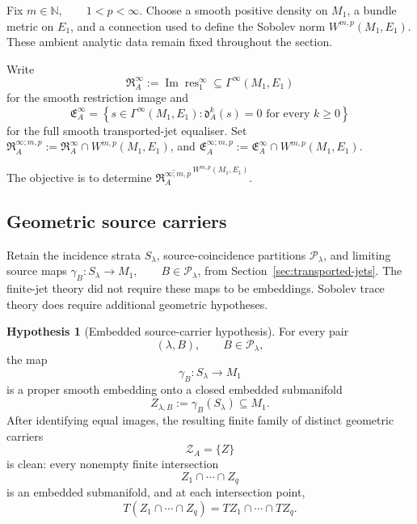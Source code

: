 \documentclass[11pt]{article}
\theoremstyle{plain}
\theoremstyle{definition}
\newtheorem{hypothesis}[theorem]{Hypothesis}
\begin{document}
Fix
\(m\in\mathbb N, \qquad 1<p<\infty\).
Choose a smooth positive density on \(M_1\), a bundle metric on
\(E_1\), and a connection used to define the Sobolev norm
\(W^{m,p}(M_1,E_1)\).
These ambient analytic data remain fixed throughout the section.

Write
\[
  \mathfrak R_A^\infty
  :=
  \operatorname{Im}\operatorname{res}_1^\infty
  \subseteq
  \Gamma^\infty(M_1,E_1)
\]
for the smooth restriction image and
\[
  \mathfrak E_A^\infty
  =
  \left\{
    s\in\Gamma^\infty(M_1,E_1):
    \mathfrak d_A^k(s)=0
    \text{ for every }k\geq0
  \right\}
\]
for the full smooth transported-jet equaliser. Set
\(\mathfrak R_A^{\infty;m,p} := \mathfrak R_A^\infty \cap W^{m,p}(M_1,E_1)\),
and
\(\mathfrak E_A^{\infty;m,p} := \mathfrak E_A^\infty \cap W^{m,p}(M_1,E_1)\).

The objective is to determine
\(\overline{ \mathfrak R_A^{\infty;m,p} }^{\,W^{m,p}(M_1,E_1)}\).

\subsection{Geometric source carriers}
\label{subsec:visible-incidence-traces}

Retain the incidence strata \(S_\lambda\), source-coincidence
partitions \(\mathcal P_\lambda\), and limiting source maps
\(\gamma_B: S_\lambda\longrightarrow M_1, \qquad B\in\mathcal P_\lambda\),
from Section~\ref{sec:transported-jets}. The finite-jet theory did not
require these maps to be embeddings. Sobolev trace theory does require
additional geometric hypotheses.

\begin{hypothesis}[Embedded source-carrier hypothesis]
\label{hyp:embedded-source-carriers}
For every pair
\[
  (\lambda,B),
  \qquad
  B\in\mathcal P_\lambda,
\]
the map
\[
  \gamma_B:
  S_\lambda\longrightarrow M_1
\]
is a proper smooth embedding onto a closed embedded submanifold
\[
  Z_{\lambda,B}
  :=
  \gamma_B(S_\lambda)
  \subseteq M_1.
\]
After identifying equal images, the resulting finite family of
distinct geometric carriers
\[
  \mathscr Z_A
  =
  \{Z\}
\]
is clean: every nonempty finite intersection
\[
  Z_1\cap\cdots\cap Z_q
\]
is an embedded submanifold, and at each intersection point,
\[
  T
  \left(
    Z_1\cap\cdots\cap Z_q
  \right)
  =
  TZ_1\cap\cdots\cap TZ_q.
\]
\end{hypothesis}
\end{document}
